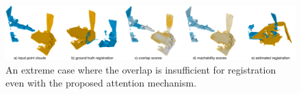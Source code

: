 \begin{figure}[t]
    \centering
    \includegraphics[width=1\columnwidth]{figures/images/one_row.jpg}
    \caption{An extreme case where the overlap is insufficient for registration even with the proposed attention mechanism.}
    \label{fig:failure_image}
\end{figure}